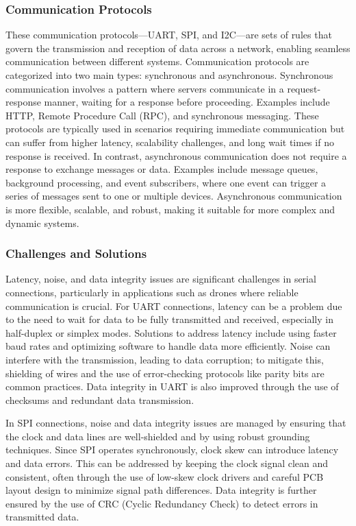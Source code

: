 \documentclass{article}
\begin{document}
\subsubsection{Communication Protocols}
These communication protocols—UART, SPI, and I2C—are sets of rules that govern the transmission and reception of data across a network, enabling seamless communication between different systems. Communication protocols are categorized into two main types: synchronous and asynchronous. Synchronous communication involves a pattern where servers communicate in a request-response manner, waiting for a response before proceeding. Examples include HTTP, Remote Procedure Call (RPC), and synchronous messaging. These protocols are typically used in scenarios requiring immediate communication but can suffer from higher latency, scalability challenges, and long wait times if no response is received.
In contrast, asynchronous communication does not require a response to exchange messages or data. Examples include message queues, background processing, and event subscribers, where one event can trigger a series of messages sent to one or multiple devices. Asynchronous communication is more flexible, scalable, and robust, making it suitable for more complex and dynamic systems.
\cite{Subero2024}

\subsubsection{Challenges and Solutions}
Latency, noise, and data integrity issues are significant challenges in serial connections, particularly in applications such as drones where reliable communication is crucial. For UART connections, latency can be a problem due to the need to wait for data to be fully transmitted and received, especially in half-duplex or simplex modes. Solutions to address latency include using faster baud rates and optimizing software to handle data more efficiently. Noise can interfere with the transmission, leading to data corruption; to mitigate this, shielding of wires and the use of error-checking protocols like parity bits are common practices. Data integrity in UART is also improved through the use of checksums and redundant data transmission.

In SPI connections, noise and data integrity issues are managed by ensuring that the clock and data lines are well-shielded and by using robust grounding techniques. Since SPI operates synchronously, clock skew can introduce latency and data errors. This can be addressed by keeping the clock signal clean and consistent, often through the use of low-skew clock drivers and careful PCB layout design to minimize signal path differences. Data integrity is further ensured by the use of CRC (Cyclic Redundancy Check) to detect errors in transmitted data.
\end{document}
